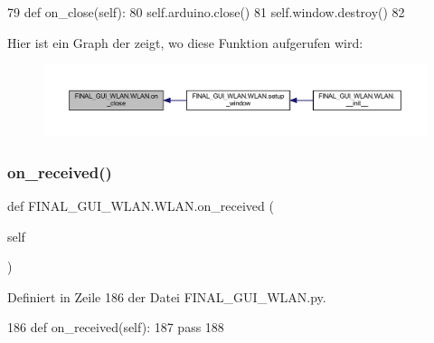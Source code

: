 \begin{DoxyCode}
79     \textcolor{keyword}{def }on\_close(self):
80         self.arduino.close()
81         self.window.destroy()
82     
\end{DoxyCode}
Hier ist ein Graph der zeigt, wo diese Funktion aufgerufen wird\+:\nopagebreak
\begin{figure}[H]
\begin{center}
\leavevmode
\includegraphics[width=350pt]{class_f_i_n_a_l___g_u_i___w_l_a_n_1_1_w_l_a_n_ae429bf3b670d0b265edc4b1a220d9c6a_icgraph}
\end{center}
\end{figure}
\mbox{\label{class_f_i_n_a_l___g_u_i___w_l_a_n_1_1_w_l_a_n_a8a83ac894d6cdbc7a12003dcd2a1d274}} 
\subsubsection{\texorpdfstring{on\+\_\+received()}{on\_received()}}
{\footnotesize\ttfamily def F\+I\+N\+A\+L\+\_\+\+G\+U\+I\+\_\+\+W\+L\+A\+N.\+W\+L\+A\+N.\+on\+\_\+received (\begin{DoxyParamCaption}\item[{}]{self }\end{DoxyParamCaption})}



Definiert in Zeile 186 der Datei F\+I\+N\+A\+L\+\_\+\+G\+U\+I\+\_\+\+W\+L\+A\+N.\+py.


\begin{DoxyCode}
186     \textcolor{keyword}{def }on\_received(self):
187         \textcolor{keywordflow}{pass}
188         
\end{DoxyCode}
\mbox{\label{class_f_i_n_a_l___g_u_i___w_l_a_n_1_1_w_l_a_n_a0a597b89e22f363d7fe7e01e561693b4}} 
